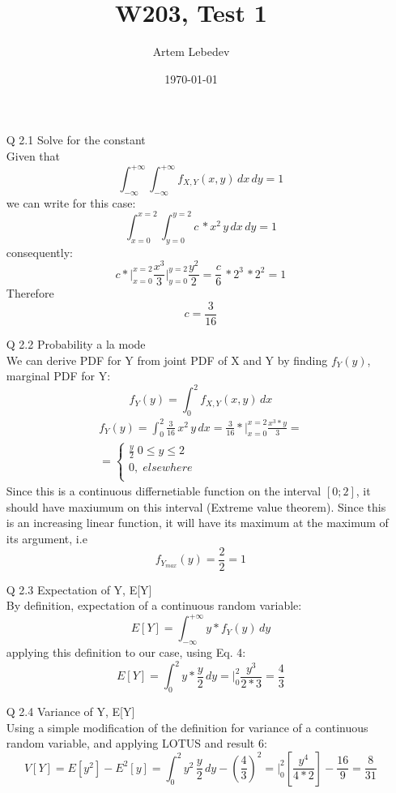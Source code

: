 \documentclass{article}
\author{Artem Lebedev}
\title{W203, Test 1}
\date{\today}
\begin{document}
\maketitle

\begin{enumerate}
\item[Q 2.1] Solve for the constant\\
	Given that
	\begin{equation}
		\int_{-\infty}^{+\infty} \int_{-\infty}^{+\infty}f_{X,Y}(x,y) \,dx\,dy = 1
	\end{equation}
	we can write for this case:
	\begin{equation}
		\int_{x=0}^{x=2} \int_{y=0}^{y=2}c\,*x^2\,y \,dx\,dy = 1
	\end{equation}
	consequently:
	\begin{equation}
		c*\Big|_{x=0}^{x=2} \frac{x^3}{3}\Big|_{y=0}^{y=2}\frac{y^2}{2} = 
		\frac{c}{6}\,*2^3\,*2^2 = 1
	\end{equation}
	Therefore $$c = \frac{3}{16}$$
\item[Q 2.2] Probability a la mode\\
	We can derive PDF for Y from joint PDF of X and Y by finding $f_Y(y)$, marginal PDF for Y:
	\begin{equation}
		f_Y(y) = \int_{0}^{2}f_{X,Y}(x,y)\,dx
	\end{equation}
	\begin{align*}
		f_Y(y) = \int_{0}^{2}\frac{3}{16}\,x^2\,y\,dx=\frac{3}{16}*\Big|_{x=0}^{x=2}\frac{x^3*y}{3}=\\
		= 	\begin{cases}
				\frac{y}{2}\;0\leq y \leq2\\
				0,\; elsewhere\\
			\end{cases}
	\end{align*}
	Since this is a continuous differnetiable function on the interval $[0;2]$, it should have maxiumum on this interval (Extreme value theorem). Since this is an increasing linear function, it will have its maximum at the maximum of its argument, i.e $$f_{Y_{max}}(y) = \frac{2}{2} = 1$$
\item[Q 2.3] Expectation of Y, E[Y]\\
	By definition, expectation of a continuous random variable:
	\begin{equation}
		E[Y] = \int_{-\infty}^{+\infty}y*f_Y(y)\,dy
	\end{equation}
	applying this definition to our case, using Eq. 4:
	\begin{equation}
		E[Y] = \int_{0}^{2}y*\frac{y}{2}\,dy = \Big|_0^2\frac{y^3}{2*3} = \frac{4}{3}
	\end{equation}
\item[Q 2.4] Variance of Y, E[Y]\\
	Using a simple modification of the definition for variance of a continuous random variable, and applying LOTUS and result 6:
	\begin{equation}
		V[Y] = E[y^2]-E^2[y] = \int_{0}^{2}y^2\,\frac{y}{2}\,dy - \left(\frac{4}{3}\right)^2 = \Big|_0^2\left[\frac{y^4}{4*2}\right] - \frac{16}{9} = \frac{8}{31}
	\end{equation}

\end{enumerate}
\end{document}
